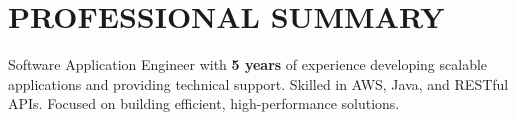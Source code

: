 \section{PROFESSIONAL SUMMARY}
\begin{onecolentry}
Software Application Engineer with \textbf{5 years} of experience developing scalable applications and providing technical support. Skilled in AWS, Java, and RESTful APIs. Focused on building efficient, high-performance solutions.
\end{onecolentry}
